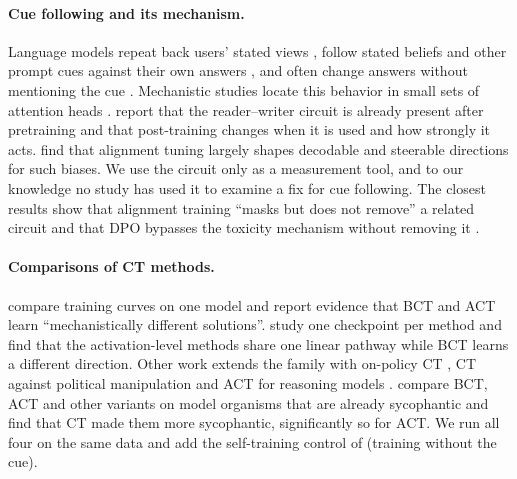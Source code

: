 \documentclass[11pt]{article}
\begin{document}
\paragraph{Cue following and its mechanism.} Language models repeat back users' stated views \citep{perez2022discovering}, follow stated beliefs and other prompt cues against their own answers \citep{sharma2024sycophancy,wei2023simple}, and often change answers without mentioning the cue \citep{turpin2023language,chua2024bct}. Mechanistic studies locate this behavior in small sets of attention heads \citep{genadi2026sycophancy,sun2026persuaded,pandey2026sharedcircuit}. \citet{gupta2026many} report that the reader--writer circuit is already present after pretraining and that post-training changes when it is used and how strongly it acts. \citet{gupta2026directions} find that alignment tuning largely shapes decodable and steerable directions for such biases. We use the circuit only as a measurement tool, and to our knowledge no study has used it to examine a fix for cue following. The closest results show that alignment training ``masks but does not remove'' a related circuit \citep{pandey2026sharedcircuit} and that DPO bypasses the toxicity mechanism without removing it \citep{lee2024mechanistic}.

\paragraph{Comparisons of CT methods.} \citet{irpan2025consistency} compare training curves on one model and report evidence that BCT and ACT learn ``mechanistically different solutions''. \citet{gautam2026stack} study one checkpoint per method and find that the activation-level methods share one linear pathway while BCT learns a different direction. Other work extends the family with on-policy CT \citep{han2026opct}, CT against political manipulation \citep{phan2026political} and ACT for reasoning models \citep{shah2026act}. \citet{africa2026entrench} compare BCT, ACT and other variants on model organisms that are already sycophantic and find that CT made them more sycophantic, significantly so for ACT. We run all four on the same data and add the self-training control of \citet{chua2024bct} (training without the cue).
\end{document}
